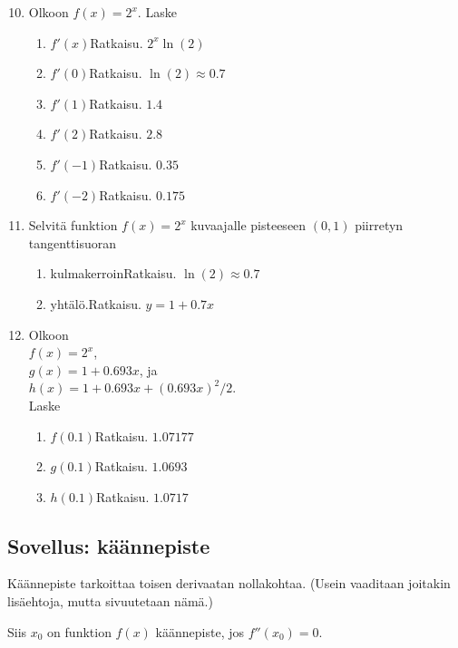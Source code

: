 \documentclass[10pt]{article}
\newcommand{\ratkaisu}[1]{\hfill{\color{blue}\quad\textrm{Ratkaisu. } #1}}
\begin{document}
\begin{minipage}{0.45\linewidth}
\begin{enumerate}
\setcounter{enumi}{9}
\item Olkoon $f(x)=2^x$. Laske
\begin{enumerate}
\item $f'(x)$\ratkaisu{$2^x\ln(2)$}
\item $f'(0)$\ratkaisu{$\ln(2)\approx 0.7$}
\item $f'(1)$\ratkaisu{$1.4$}
\item $f'(2)$\ratkaisu{$2.8$}
\item $f'(-1)$\ratkaisu{$0.35$}
\item $f'(-2)$\ratkaisu{$0.175$}
\end{enumerate}
\item Selvitä funktion $f(x)=2^x$ kuvaajalle pisteeseen $(0,1)$ piirretyn tangenttisuoran 
\begin{enumerate}
\item kulmakerroin\ratkaisu{$\ln(2)\approx 0.7$}
\item yhtälö.\ratkaisu{$y=1+0.7x$}
\end{enumerate}

\item Olkoon\\ $f(x)=2^x$,\\  $g(x)=1+0.693x$, ja\\ $h(x)=1+0.693x+(0.693x)^2/2$.\\

Laske
\begin{enumerate}
\item $f(0.1)$\ratkaisu{$1.07177$}
\item $g(0.1)$\ratkaisu{$1.0693$}
\item $h(0.1)$\ratkaisu{$1.0717$}
\end{enumerate}
\end{enumerate}
\newpage
\end{minipage}

\newpage
\subsection{Sovellus: käännepiste}

Käännepiste tarkoittaa toisen derivaatan nollakohtaa. (Usein vaaditaan joitakin lisäehtoja, mutta sivuutetaan nämä.)

Siis $x_0$ on funktion $f(x)$ käännepiste, jos $f''(x_0)=0$.\\
\end{document}
